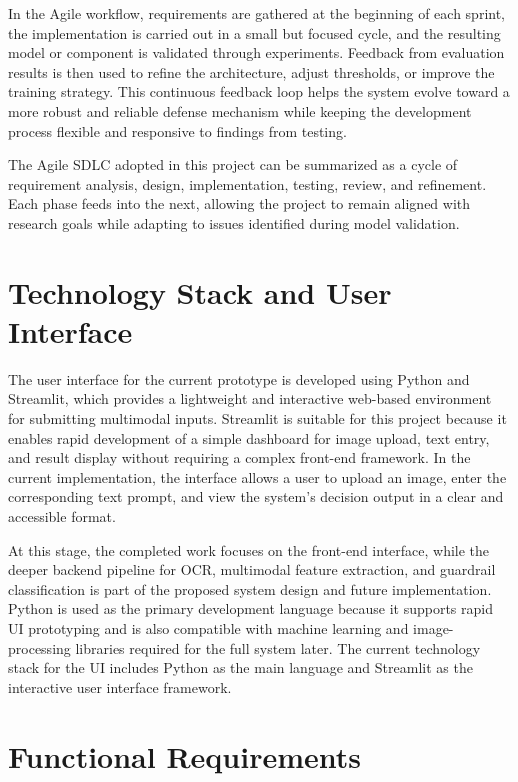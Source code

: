 In the Agile workflow, requirements are gathered at the beginning of each sprint, the implementation is carried out in a small but focused cycle, and the resulting model or component is validated through experiments. Feedback from evaluation results is then used to refine the architecture, adjust thresholds, or improve the training strategy. This continuous feedback loop helps the system evolve toward a more robust and reliable defense mechanism while keeping the development process flexible and responsive to findings from testing.

The Agile SDLC adopted in this project can be summarized as a cycle of requirement analysis, design, implementation, testing, review, and refinement. Each phase feeds into the next, allowing the project to remain aligned with research goals while adapting to issues identified during model validation.

\section{Technology Stack and User Interface}

The user interface for the current prototype is developed using Python and Streamlit, which provides a lightweight and interactive web-based environment for submitting multimodal inputs. Streamlit is suitable for this project because it enables rapid development of a simple dashboard for image upload, text entry, and result display without requiring a complex front-end framework. In the current implementation, the interface allows a user to upload an image, enter the corresponding text prompt, and view the system's decision output in a clear and accessible format.

At this stage, the completed work focuses on the front-end interface, while the deeper backend pipeline for OCR, multimodal feature extraction, and guardrail classification is part of the proposed system design and future implementation. Python is used as the primary development language because it supports rapid UI prototyping and is also compatible with machine learning and image-processing libraries required for the full system later. The current technology stack for the UI includes Python as the main language and Streamlit as the interactive user interface framework.

\section{Functional Requirements}

